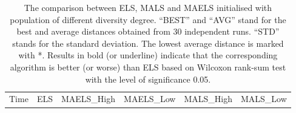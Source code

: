 \documentclass[journal]{IEEEtran}
\begin{document}
\begin{table}[htbp]
	\centering
	\caption{\label{data_comparison}
		The comparison between ELS, MALS and MAELS initialised with population of different diversity degree. ``BEST'' and ``AVG'' stand for the best and average distances obtained from 30 independent runs. ``STD'' stands for the standard deviation. The lowest average distance is marked with *. Results in bold (or underline) indicate that the corresponding algorithm is better (or worse) than ELS based on Wilcoxon rank-sum test with the level of significance 0.05.}
	\setlength{\tabcolsep}{4pt}
	\begin{tabular}{|c|ccc|ccc|ccc|ccc|ccc|}
		\hline
		\multirow{1}{*}{Time} & 
		\multicolumn{3}{c|}{ELS} &
		\multicolumn{3}{c|}{MAELS\_High} &
		\multicolumn{3}{c|}{MAELS\_Low} & 
		\multicolumn{3}{c|}{MALS\_High} &
		\multicolumn{3}{c|}{MALS\_Low}\\
		

\end{tabular}
\end{table}
\end{document}

